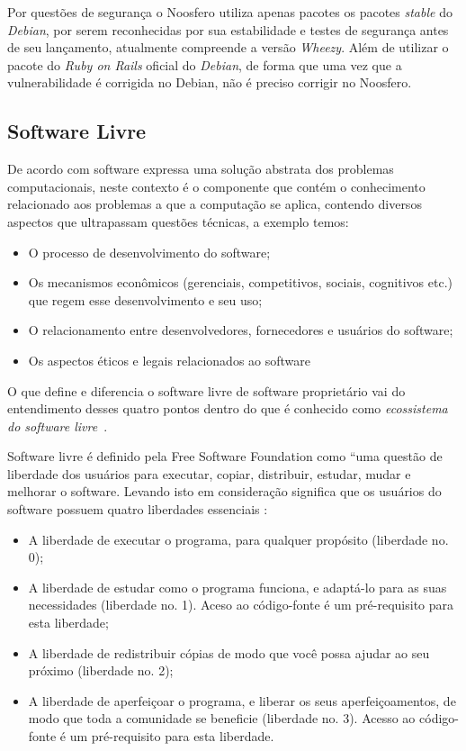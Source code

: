 Por questões de segurança o Noosfero utiliza apenas pacotes os pacotes \textit{stable} do \textit{Debian}, por serem reconhecidas por sua estabilidade e testes de segurança antes de seu lançamento, atualmente compreende a versão \textit{Wheezy}. Além de utilizar o pacote do \textit{Ruby on Rails} oficial do \textit{Debian}, de forma que uma vez que a vulnerabilidade é corrigida no Debian, não é preciso corrigir no Noosfero.

\subsection{Software Livre}
\label{soft-livre}

De acordo com \cite{meirelles2013} software expressa uma solução abstrata dos problemas computacionais, neste contexto é o componente que contém o conhecimento relacionado aos problemas a que a computação se aplica, contendo diversos aspectos que ultrapassam questões técnicas, a exemplo temos:
\begin{itemize}
\item O processo de desenvolvimento do software;
\item Os mecanismos econômicos (gerenciais, competitivos, sociais, cognitivos etc.) que regem esse desenvolvimento e seu uso;
\item O relacionamento entre desenvolvedores, fornecedores e usuários do software;
\item Os aspectos éticos e legais relacionados ao software
\end{itemize}

O que define e diferencia o software livre de software proprietário vai do entendimento desses quatro pontos dentro do que é conhecido como \textit{ecossistema do software livre}~\cite{meirelles2013}.

Software livre é definido pela Free Software Foundation como “uma questão de liberdade dos usuários para executar, copiar, distribuir, estudar, mudar e melhorar o software. Levando isto em consideração significa que os usuários do software possuem quatro liberdades essenciais \cite{stallman2002free}:

\begin{itemize}
\item A liberdade de executar o programa, para qualquer propósito (liberdade no. 0);
\item A liberdade de estudar como o programa funciona, e adaptá-lo para as suas necessidades (liberdade no. 1). Aceso ao código-fonte é um pré-requisito para esta liberdade;
\item A liberdade de redistribuir cópias de modo que você possa ajudar ao seu próximo (liberdade no. 2);
\item A liberdade de aperfeiçoar o programa, e liberar os seus aperfeiçoamentos, de modo que toda a comunidade se beneficie (liberdade no. 3). Acesso ao código-fonte é um pré-requisito para esta liberdade.
\end{itemize}

